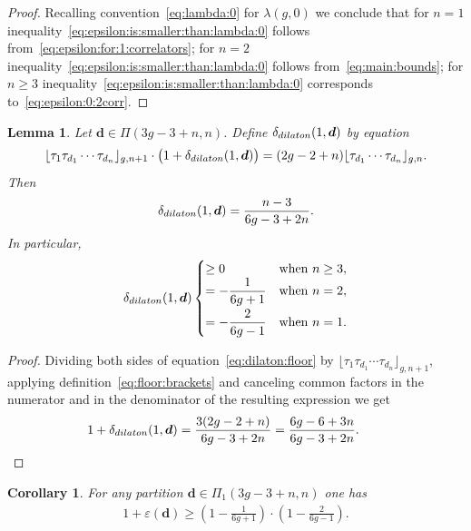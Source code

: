 \documentclass[11pt]{article}
\renewcommand{\epsilon}{\varepsilon}
\newtheorem{Lemma}[Theorem]{Lemma}
\newtheorem{Corollary}[Theorem]{Corollary}
\theoremstyle{definition}
\begin{document}
\begin{proof}Recalling convention~\eqref{eq:lambda:0} for $\lambda(g,0)$ we conclude that
for $n=1$ inequality~\eqref{eq:epsilon:is:smaller:than:lambda:0}
follows from~\eqref{eq:epsilon:for:1:correlators};
for $n=2$ inequality~\eqref{eq:epsilon:is:smaller:than:lambda:0}
follows from~\eqref{eq:main:bounds};
for $n\ge 3$ inequality~\eqref{eq:epsilon:is:smaller:than:lambda:0}
corresponds to~\eqref{eq:epsilon:0:2corr}.
\end{proof}

\begin{Lemma}\label{lm:dilaton}
Let $\boldsymbol{d}\in\Pi(3g-3+n,n)$.
Define $\delta_{\rm dilaton}(1,\boldsymbol{d})$
by equation
\begin{gather}\label{eq:dilaton:floor}
\lfloor \tau_1\tau_{d_1} \cdots \tau_{d_n}\rfloor_{g,n+1}
\cdot\big(1+\delta_{\rm dilaton}(1,\boldsymbol{d})\big)
=(2g-2+n)
\lfloor \tau_{d_1} \cdots \tau_{d_n}\rfloor_{g,n} .
\end{gather}
Then
\[
\delta_{\rm dilaton}(1,\boldsymbol{d})
=\frac{n-3}{6g-3+2n} .
\]
In particular,
\begin{gather}\label{eq:delta:dilaton}
\delta_{\rm dilaton}(1,\boldsymbol{d})
\begin{cases}
\ge 0&\text{when }n\ge 3 ,
\\
= -\dfrac{1}{6g+1}
&\text{when }n=2 ,
\vspace{1mm}\\
= -\dfrac{2}{6g-1}
&\text{when }n=1 .
\end{cases}
\end{gather}
\end{Lemma}

\begin{proof}Dividing both sides of equation~\eqref{eq:dilaton:floor} by
$\lfloor \tau_1\tau_{d_1} \cdots \tau_{d_n}\rfloor_{g,n+1}$,
applying definition~\eqref{eq:floor:brackets}
and canceling common factors in the numerator and in the denominator
of the resulting expression we get
\[
1+\delta_{\rm dilaton}(1,\boldsymbol{d})
=\frac{3(2g-2+n)}{6g-3+2n}
=\frac{6g-6+3n}{6g-3+2n} .\tag*{\qed}
\]\renewcommand{\qed}{}
\end{proof}

\begin{Corollary}\label{cor:epsilon:L:1}
For any partition
$\boldsymbol{d}\in\Pi_1(3g-3+n,n)$ one has
\begin{gather}\label{eq:epsilon:L:1}
1+\epsilon(\boldsymbol{d})\ge
\left(1-\frac{1}{6g+1}\right)
\cdot\left(1-\frac{2}{6g-1}\right) .
\end{gather}
\end{Corollary}
\end{document}
